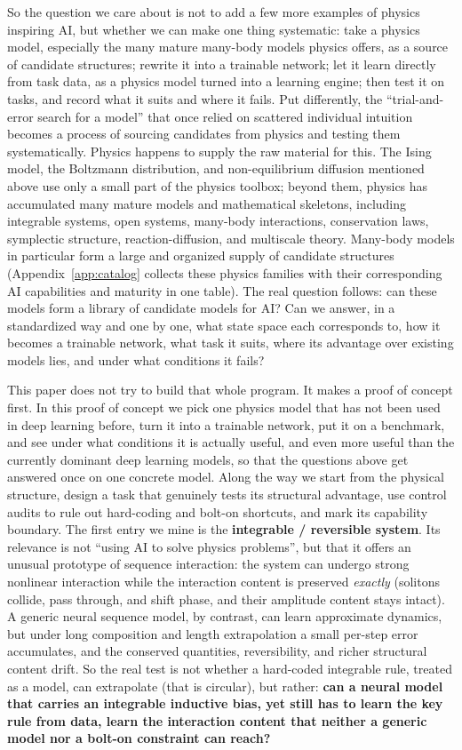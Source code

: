 \documentclass[11pt]{article}
\theoremstyle{definition}
\theoremstyle{plain}
\begin{document}
So the question we care about is not to add a few more examples of physics inspiring AI, but
whether we can make one thing systematic: take a physics model, especially the many mature
many-body models physics offers, as a source of candidate structures; rewrite it into a
trainable network; let it learn directly from task data, as a physics model turned into a
learning engine; then test it on tasks, and record what it suits and where it fails. Put
differently, the ``trial-and-error search for a model'' that once relied on scattered
individual intuition becomes a process of sourcing candidates from physics and testing them
systematically. Physics happens to supply the raw material for this. The Ising model, the
Boltzmann distribution, and non-equilibrium diffusion mentioned above use only a small part
of the physics toolbox; beyond them, physics has accumulated many mature models and
mathematical skeletons, including integrable systems, open systems, many-body interactions,
conservation laws, symplectic structure, reaction-diffusion, and multiscale theory. Many-body
models in particular form a large and organized supply of candidate structures (Appendix~\ref{app:catalog}
collects these physics families with their corresponding AI capabilities and maturity in one
table). The real question follows: can these models form a library of candidate models for AI?
Can we answer, in a standardized way and one by one, what state space each corresponds to, how
it becomes a trainable network, what task it suits, where its advantage over existing models
lies, and under what conditions it fails?

This paper does not try to build that whole program. It makes a proof of concept first. In this
proof of concept we pick one physics model that has not been used in deep learning before, turn
it into a trainable network, put it on a benchmark, and see under what conditions it is actually
useful, and even more useful than the currently dominant deep learning models, so that the
questions above get answered once on one concrete model. Along the way we start from the
physical structure, design a task that genuinely tests its structural advantage, use control
audits to rule out hard-coding and bolt-on shortcuts, and mark its capability boundary. The
first entry we mine is the \textbf{integrable / reversible system}. Its relevance is not
``using AI to solve physics problems'', but that it offers an unusual prototype of sequence
interaction: the system can undergo strong nonlinear interaction while the interaction content
is preserved \emph{exactly} (solitons collide, pass through, and shift phase, and their
amplitude content stays intact). A generic neural sequence model, by contrast, can learn
approximate dynamics, but under long composition and length extrapolation a small per-step
error accumulates, and the conserved quantities, reversibility, and richer structural content
drift. So the real test is not whether a hard-coded integrable rule, treated as a model, can
extrapolate (that is circular), but rather: \textbf{can a neural model that carries an
integrable inductive bias, yet still has to learn the key rule from data, learn the interaction
content that neither a generic model nor a bolt-on constraint can reach?}
\end{document}
